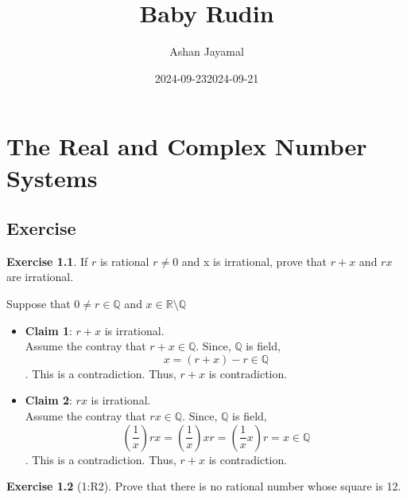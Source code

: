 \documentclass[
]{book}
\title{Baby Rudin}
\author{Ashan Jayamal}
\date{2024-09-23}
\date{2024-09-21}
\theoremstyle{definition}
\theoremstyle{definition}
\theoremstyle{definition}
\newtheorem{exercise}{Exercise}[chapter]
\theoremstyle{definition}
\theoremstyle{remark}
\begin{document}
\maketitle

{
\setcounter{tocdepth}{1}
\tableofcontents
}
\chapter{The Real and Complex Number Systems}\label{the-real-and-complex-number-systems}

\section{Exercise}\label{exercise}

\begin{exercise}
\protect\hypertarget{exr:unnamed-chunk-1}{}\label{exr:unnamed-chunk-1}If \(r\) is rational \(r\neq 0\) and x is irrational, prove that \(r + x\) and \(rx\) are irrational.
\end{exercise}

Suppose that \(0 \neq r \in \mathbb{Q}\) and \(x\in \mathbb{R}\setminus \mathbb{Q}\)

\begin{itemize}
\item
  \textbf{Claim 1}: \(r+x\) is irrational.\\
  Assume the contray that \(r+x\in \mathbb{Q}\). Since, \(\mathbb{Q}\) is field,
  \[x=(r+x)-r\in \mathbb{Q}\]. This is a contradiction. Thus, \(r+x\) is contradiction.
\item
  \textbf{Claim 2}: \(rx\) is irrational.\\
  Assume the contray that \(rx\in \mathbb{Q}\). Since, \(\mathbb{Q}\) is field,
  \[\left(\frac{1}{x}\right)rx=\left(\frac{1}{x}\right)xr=\left(\frac{1}{x}x\right)r=x\in \mathbb{Q}\]. This is a contradiction. Thus, \(r+x\) is contradiction.
\end{itemize}

\begin{exercise}[1:R2]
\protect\hypertarget{exr:unnamed-chunk-2}{}\label{exr:unnamed-chunk-2}Prove that there is no rational number whose square is 12.
\end{exercise}
\end{document}
